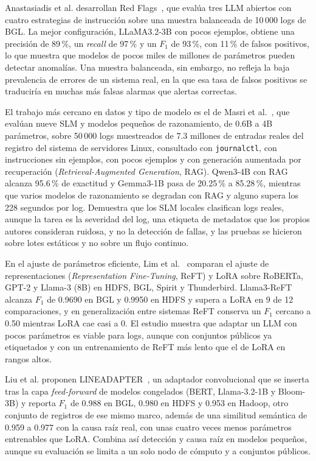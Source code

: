 Anastasiadis et al. desarrollan Red Flags~\cite{anastasiadis2026_redflags}, que evalúa tres LLM abiertos con cuatro estrategias de instrucción sobre una muestra balanceada de 10\,000 logs de BGL. La mejor configuración, LLaMA3.2-3B con pocos ejemplos, obtiene una precisión de 89\,\%, un \textit{recall} de 97\,\% y un $F_1$ de 93\,\%, con 11\,\% de falsos positivos, lo que muestra que modelos de pocos miles de millones de parámetros pueden detectar anomalías. Una muestra balanceada, sin embargo, no refleja la baja prevalencia de errores de un sistema real, en la que esa tasa de falsos positivos se traduciría en muchas más falsas alarmas que alertas correctas.

El trabajo más cercano en datos y tipo de modelo es el de Masri et al.~\cite{masri2026_slm_severity}, que evalúan nueve SLM y modelos pequeños de razonamiento, de 0.6B a 4B parámetros, sobre 50\,000 logs muestreados de 7.3 millones de entradas reales del registro del sistema de servidores Linux, consultado con \texttt{journalctl}, con instrucciones sin ejemplos, con pocos ejemplos y con generación aumentada por recuperación (\textit{Retrieval-Augmented Generation}, RAG). Qwen3-4B con RAG alcanza 95.6\,\% de exactitud y Gemma3-1B pasa de 20.25\,\% a 85.28\,\%, mientras que varios modelos de razonamiento se degradan con RAG y alguno supera los 228 segundos por log. Demuestra que los SLM locales clasifican logs reales, aunque la tarea es la severidad del log, una etiqueta de metadatos que los propios autores consideran ruidosa, y no la detección de fallas, y las pruebas se hicieron sobre lotes estáticos y no sobre un flujo continuo.

En el ajuste de parámetros eficiente, Lim et al.~\cite{lim2025_logadreft} comparan el ajuste de representaciones (\textit{Representation Fine-Tuning}, ReFT) y LoRA sobre RoBERTa, GPT-2 y Llama-3 (8B) en HDFS, BGL, Spirit y Thunderbird. Llama3-ReFT alcanza $F_1$ de 0.9690 en BGL y 0.9950 en HDFS y supera a LoRA en 9 de 12 comparaciones, y en generalización entre sistemas ReFT conserva un $F_1$ cercano a 0.50 mientras LoRA cae casi a 0. El estudio muestra que adaptar un LLM con pocos parámetros es viable para logs, aunque con conjuntos públicos ya etiquetados y con un entrenamiento de ReFT más lento que el de LoRA en rangos altos.

Liu et al. proponen LINEADAPTER~\cite{liu2025_lineadapter}, un adaptador convolucional que se inserta tras la capa \textit{feed-forward} de modelos congelados (BERT, Llama-3.2-1B y Bloom-3B) y reporta $F_1$ de 0.988 en BGL, 0.980 en HDFS y 0.953 en Hadoop, otro conjunto de registros de ese mismo marco, además de una similitud semántica de 0.959 a 0.977 con la causa raíz real, con unas cuatro veces menos parámetros entrenables que LoRA. Combina así detección y causa raíz en modelos pequeños, aunque su evaluación se limita a un solo nodo de cómputo y a conjuntos públicos.

